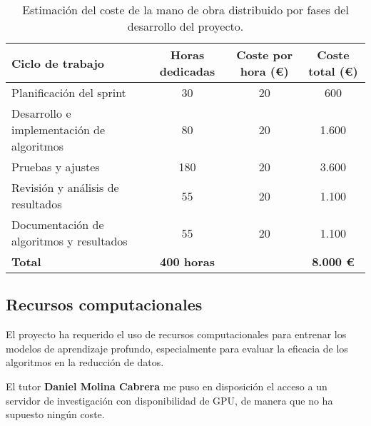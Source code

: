 \begin{table}[htp]\label{tab:mano-de-obra}
    \centering
    \begin{adjustbox}{width=\linewidth}
        \begin{tabular}{|l|c|c|c|}
            \hline
            \textbf{Ciclo de trabajo}                 & \textbf{Horas dedicadas} & \textbf{Coste por hora (€)} &
            \textbf{Coste total (€)}                                                                                              \\ \hline
            Planificación del sprint                  & 30                       & 20                          & 600              \\
            Desarrollo e implementación de algoritmos & 80                       & 20                          & 1.600            \\
            Pruebas y ajustes                         & 180                      & 20                          & 3.600            \\
            Revisión y análisis de resultados         & 55                       & 20                          & 1.100            \\
            Documentación de algoritmos y resultados  & 55                       & 20                          & 1.100            \\ \hline
            \textbf{Total}                            & \textbf{400 horas}       &                             & \textbf{8.000 €} \\ \hline
        \end{tabular}
    \end{adjustbox}
    \caption{Estimación del coste de la mano de obra distribuido por fases del desarrollo del proyecto.}
\end{table}


\subsection{Recursos computacionales}\label{subsec:recursos-computacionales}
El proyecto ha requerido el uso de recursos computacionales para entrenar los modelos de aprendizaje profundo,
especialmente para evaluar la eficacia de los algoritmos en la reducción de datos.


El tutor \textbf{Daniel Molina Cabrera} me puso en disposición el acceso a un servidor de investigación con
disponibilidad de GPU, de manera que no ha supuesto ningún coste.


